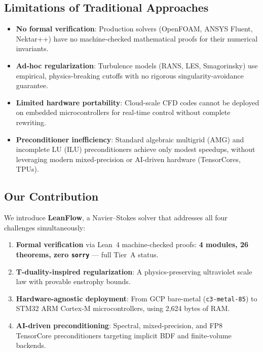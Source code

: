 \documentclass[11pt,a4paper,twoside]{article}
\begin{document}
\subsection{Limitations of Traditional Approaches}

\begin{itemize}[leftmargin=*]
\item \textbf{No formal verification}: Production solvers (OpenFOAM, ANSYS Fluent, Nektar++) have no machine-checked mathematical proofs for their numerical invariants.
\item \textbf{Ad-hoc regularization}: Turbulence models (RANS, LES, Smagorinsky) use empirical, physics-breaking cutoffs with no rigorous singularity-avoidance guarantee.
\item \textbf{Limited hardware portability}: Cloud-scale CFD codes cannot be deployed on embedded microcontrollers for real-time control without complete rewriting.
\item \textbf{Preconditioner inefficiency}: Standard algebraic multigrid (AMG) and incomplete LU (ILU) preconditioners achieve only modest speedups, without leveraging modern mixed-precision or AI-driven hardware (TensorCores, TPUs).
\end{itemize}

\subsection{Our Contribution}

We introduce \textbf{LeanFlow}, a Navier--Stokes solver that addresses all four challenges simultaneously:

\begin{enumerate}[leftmargin=*]
\item \textbf{Formal verification} via Lean~4 machine-checked proofs: \textbf{4 modules, 26 theorems, zero \texttt{sorry}} --- full Tier~A status.
\item \textbf{T-duality-inspired regularization}: A physics-preserving ultraviolet scale law with provable enstrophy bounds.
\item \textbf{Hardware-agnostic deployment}: From GCP bare-metal (\texttt{c3-metal-85}) to STM32 ARM Cortex-M microcontrollers, using 2,624 bytes of RAM.
\item \textbf{AI-driven preconditioning}: Spectral, mixed-precision, and FP8 TensorCore preconditioners targeting implicit BDF and finite-volume backends.
\end{enumerate}
\end{document}

